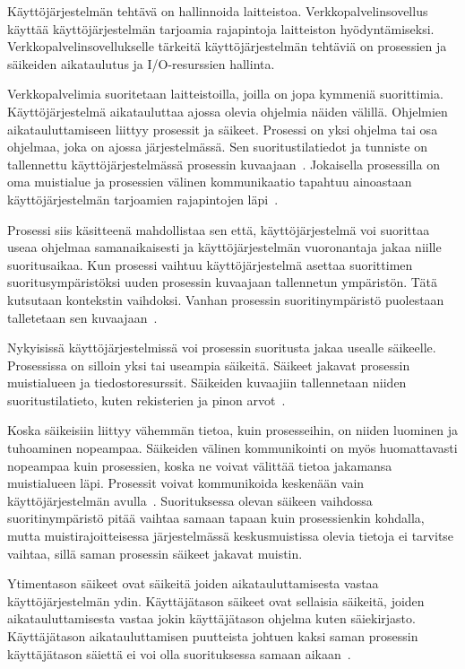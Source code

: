 \documentclass[finnish]{tktltiki2}%
\theoremstyle{definition}
\theoremstyle{remark}
\begin{document}
Käyttöjärjestelmän tehtävä on hallinnoida laitteistoa.
Verkkopalvelinsovellus käyttää käyttöjärjestelmän
tarjoamia rajapintoja laitteiston hyödyntämiseksi.
Verkkopalvelinsovellukselle tärkeitä
käyttöjärjestelmän tehtäviä on 
prosessien ja säikeiden aikataulutus ja I/O-resurssien hallinta.

Verkkopalvelimia suoritetaan laitteistoilla, joilla
on jopa kymmeniä suorittimia. Käyttöjärjestelmä
aikatauluttaa ajossa olevia ohjelmia näiden välillä.
Ohjelmien aikatauluttamiseen liittyy prosessit ja säikeet.
Prosessi on yksi ohjelma tai osa ohjelmaa, joka on ajossa järjestelmässä.
Sen suoritustilatiedot ja tunniste on
tallennettu käyttöjärjestelmässä prosessin kuvaajaan~\cite{stallings_operating_2018}.
Jokaisella
prosessilla on oma muistialue ja prosessien välinen kommunikaatio
tapahtuu ainoastaan käyttöjärjestelmän tarjoamien
rajapintojen läpi~\cite{stallings_operating_2018}.

Prosessi siis käsitteenä mahdollistaa sen että, käyttöjärjestelmä
voi suorittaa useaa ohjelmaa samanaikaisesti ja käyttöjärjestelmän
vuoronantaja jakaa niille suoritusaikaa. Kun prosessi vaihtuu
käyttöjärjestelmä asettaa suorittimen suoritusympäristöksi
uuden prosessin kuvaajaan tallennetun ympäristön. Tätä kutsutaan kontekstin
vaihdoksi. Vanhan prosessin suoritinympäristö puolestaan talletetaan sen
kuvaajaan~\cite{stallings_operating_2018}.

Nykyisissä käyttöjärjestelmissä voi prosessin suoritusta jakaa usealle
säikeelle. Prosessissa on silloin yksi tai useampia säikeitä.
Säikeet jakavat prosessin muistialueen ja tiedostoresurssit.
Säikeiden kuvaajiin
tallennetaan niiden suoritustilatieto,
kuten rekisterien ja pinon arvot~\cite{stallings_operating_2018}.

Koska säikeisiin liittyy vähemmän tietoa, kuin prosesseihin,
on niiden luominen ja tuhoaminen nopeampaa. Säikeiden välinen
kommunikointi on myös huomattavasti nopeampaa kuin prosessien, koska
ne voivat välittää tietoa jakamansa muistialueen läpi.
Prosessit voivat kommunikoida keskenään vain käyttöjärjestelmän
avulla~\cite{stallings_operating_2018}.
Suorituksessa olevan säikeen
vaihdossa suoritinympäristö pitää vaihtaa
samaan tapaan kuin prosessienkin kohdalla, mutta muistirajoitteisessa
järjestelmässä keskusmuistissa olevia
tietoja ei tarvitse vaihtaa, sillä saman prosessin säikeet jakavat
muistin.

Ytimentason säikeet ovat säikeitä joiden aikatauluttamisesta vastaa
käyttöjärjestelmän ydin. Käyttäjätason säikeet ovat sellaisia säikeitä,
joiden aikatauluttamisesta vastaa jokin käyttäjätason ohjelma kuten
säiekirjasto. Käyttäjätason aikatauluttamisen puutteista johtuen
kaksi saman prosessin käyttäjätason säiettä ei voi olla suorituksessa
samaan aikaan~\cite{stallings_operating_2018}. 
\end{document}
